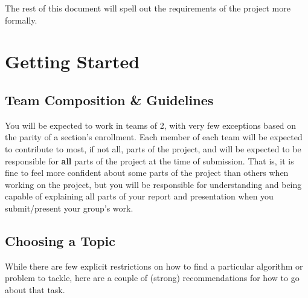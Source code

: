 \documentclass{article}
\begin{document}
The rest of this document will spell out the requirements of the project more formally. 

\section{Getting Started}
\subsection{Team Composition \& Guidelines}

You will be expected to work in teams of 2, with very few exceptions based on the parity of a section's enrollment. Each member of each team will be expected to contribute to most, if not all, parts of the project, and will be expected to be responsible for \textbf{all} parts of the project at the time of submission. That is, it is fine to feel more confident about some parts of the project than others when working on the project, but you will be responsible for understanding and being capable of explaining all parts of your report and presentation when you submit/present your group's work. 

\subsection{Choosing a Topic}

While there are few explicit restrictions on how to find a particular algorithm or problem to tackle, here are a couple of (strong) recommendations for how to go about that task.
\end{document}
